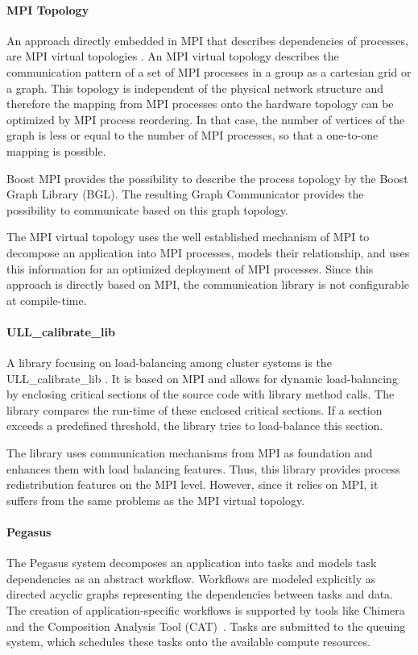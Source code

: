 \paragraph*{MPI Topology}
An approach directly embedded in MPI that describes dependencies of
processes, are MPI virtual topologies \cite{ref:mpi_topology}. An MPI
virtual topology describes the communication pattern of a set of MPI
processes in a group as a cartesian grid or a graph.  This topology is
independent of the physical network structure and therefore the
mapping from MPI processes onto the hardware topology can be optimized
by MPI process reordering. In that case, the number of vertices of the
graph is less or equal to the number of MPI processes, so that a
one-to-one mapping is possible.

Boost MPI provides the possibility to describe the process topology by
the Boost Graph Library (BGL)\cite{ref:boost_bgl}.  The resulting
Graph Communicator \cite{ref:boost_graph_communicator} provides the
possibility to communicate based on this graph topology.

The MPI virtual topology uses the well established
mechanism of MPI to decompose an application into MPI processes,
models their relationship, and uses this information for an optimized
deployment of MPI processes.  Since this approach is directly based on
MPI, the communication library is not configurable at compile-time.

\paragraph*{ULL\_calibrate\_lib}
A library focusing on load-balancing among cluster systems is the
ULL\_calibrate\_lib \cite{ref:ull_calibrate_lib}. It is based on MPI
and allows for dynamic load-balancing by enclosing critical sections
of the source code with library method calls. The library compares the
run-time of these enclosed critical sections. If a section exceeds a
predefined threshold, the library tries to load-balance this section.

The library uses communication mechanisms from MPI as foundation and
enhances them with load balancing features. Thus, this library
provides process redistribution features on the MPI level. However, since
it relies on MPI, it suffers from the same problems as the MPI virtual
topology.

\paragraph*{Pegasus}
The Pegasus system \cite{ref:pegasus} decomposes an application into
tasks and models task dependencies as an abstract workflow. Workflows
are modeled explicitly as directed acyclic graphs representing the
dependencies between tasks and data. The creation of
application-specific workflows is supported by tools like
Chimera~\cite{Foster:2002:CAD:646500.695938} and the Composition
Analysis Tool (CAT)~\cite{Kim:2004:IAI:964442.964466}.  Tasks are submitted to the
queuing system, which schedules these tasks onto the available compute
resources.

